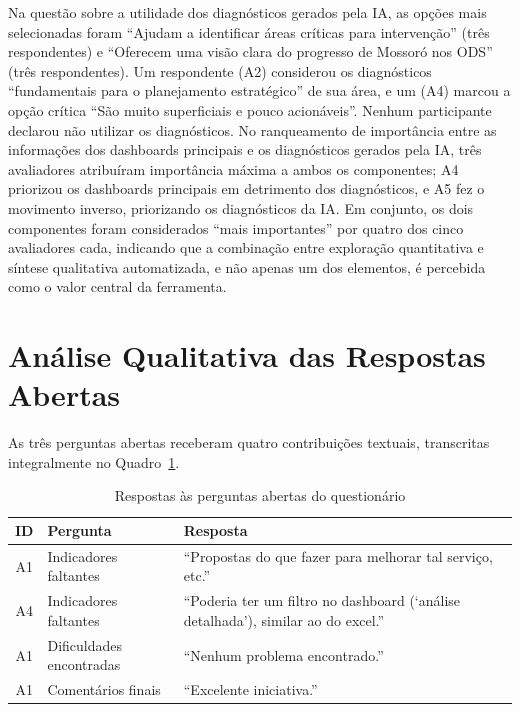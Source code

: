 Na questão sobre a utilidade dos diagnósticos gerados pela IA, as opções mais selecionadas foram ``Ajudam a identificar áreas críticas para intervenção'' (três respondentes) e ``Oferecem uma visão clara do progresso de Mossoró nos ODS'' (três respondentes). Um respondente (A2) considerou os diagnósticos ``fundamentais para o planejamento estratégico'' de sua área, e um (A4) marcou a opção crítica ``São muito superficiais e pouco acionáveis''. Nenhum participante declarou não utilizar os diagnósticos. No ranqueamento de importância entre as informações dos dashboards principais e os diagnósticos gerados pela IA, três avaliadores atribuíram importância máxima a ambos os componentes; A4 priorizou os dashboards principais em detrimento dos diagnósticos, e A5 fez o movimento inverso, priorizando os diagnósticos da IA. Em conjunto, os dois componentes foram considerados ``mais importantes'' por quatro dos cinco avaliadores cada, indicando que a combinação entre exploração quantitativa e síntese qualitativa automatizada, e não apenas um dos elementos, é percebida como o valor central da ferramenta.

\section{Análise Qualitativa das Respostas Abertas}
\label{sec:analise-qualitativa}

As três perguntas abertas receberam quatro contribuições textuais, transcritas integralmente no Quadro~\ref{tab:respostas-abertas}.

\begin{table}[h!]
    \centering
    \caption{Respostas às perguntas abertas do questionário}
    \label{tab:respostas-abertas}
    \begin{tabular}{clp{8.5cm}}
        \hline
        \textbf{ID} & \textbf{Pergunta} & \textbf{Resposta} \\
        \hline
        A1 & Indicadores faltantes & ``Propostas do que fazer para melhorar tal serviço, etc.'' \\
        A4 & Indicadores faltantes & ``Poderia ter um filtro no dashboard (`análise detalhada'), similar ao do excel.'' \\
        A1 & Dificuldades encontradas & ``Nenhum problema encontrado.'' \\
        A1 & Comentários finais & ``Excelente iniciativa.'' \\
        \hline
    \end{tabular}
\end{table}

